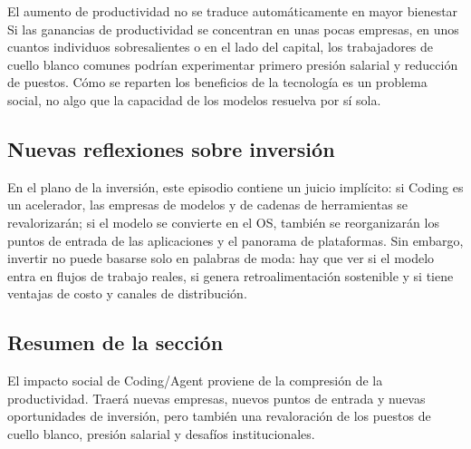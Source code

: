 \begin{warningbox}{El aumento de productividad no se traduce automáticamente en mayor bienestar}
Si las ganancias de productividad se concentran en unas pocas empresas, en unos cuantos individuos sobresalientes o en el lado del capital, los trabajadores de cuello blanco comunes podrían experimentar primero presión salarial y reducción de puestos. Cómo se reparten los beneficios de la tecnología es un problema social, no algo que la capacidad de los modelos resuelva por sí sola.
\end{warningbox}

\subsection{Nuevas reflexiones sobre inversión}

En el plano de la inversión, este episodio contiene un juicio implícito: si Coding es un acelerador, las empresas de modelos y de cadenas de herramientas se revalorizarán; si el modelo se convierte en el OS, también se reorganizarán los puntos de entrada de las aplicaciones y el panorama de plataformas. Sin embargo, invertir no puede basarse solo en palabras de moda: hay que ver si el modelo entra en flujos de trabajo reales, si genera retroalimentación sostenible y si tiene ventajas de costo y canales de distribución.

\subsection{Resumen de la sección}

El impacto social de Coding/Agent proviene de la compresión de la productividad. Traerá nuevas empresas, nuevos puntos de entrada y nuevas oportunidades de inversión, pero también una revaloración de los puestos de cuello blanco, presión salarial y desafíos institucionales.
